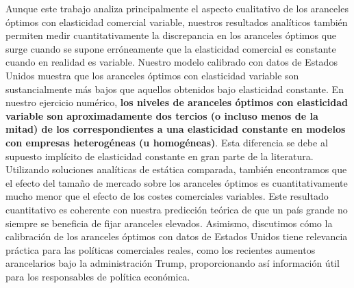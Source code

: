 \documentclass[10pt,a4paper]{article}
\begin{document}
Aunque este trabajo analiza principalmente el aspecto cualitativo de los aranceles óptimos con elasticidad comercial variable, nuestros resultados analíticos también permiten medir cuantitativamente la discrepancia en los aranceles óptimos que surge cuando se supone erróneamente que la elasticidad comercial es constante cuando en realidad es variable. Nuestro modelo calibrado con datos de Estados Unidos muestra que los aranceles óptimos con elasticidad variable son sustancialmente más bajos que aquellos obtenidos bajo elasticidad constante. En nuestro ejercicio numérico, \textbf{los niveles de aranceles óptimos con elasticidad variable son aproximadamente dos tercios (o incluso menos de la mitad) de los correspondientes a una elasticidad constante en modelos con empresas heterogéneas (u homogéneas)}. Esta diferencia se debe al supuesto implícito de elasticidad constante en gran parte de la literatura. Utilizando soluciones analíticas de estática comparada, también encontramos que el efecto del tamaño de mercado sobre los aranceles óptimos es cuantitativamente mucho menor que el efecto de los costes comerciales variables. Este resultado cuantitativo es coherente con nuestra predicción teórica de que un país grande no siempre se beneficia de fijar aranceles elevados. Asimismo, discutimos cómo la calibración de los aranceles óptimos con datos de Estados Unidos tiene relevancia práctica para las políticas comerciales reales, como los recientes aumentos arancelarios bajo la administración Trump, proporcionando así información útil para los responsables de política económica.
\end{document}
